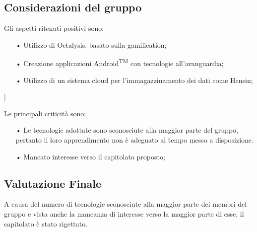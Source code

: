 \subsection{Considerazioni del gruppo}
Gli aspetti ritenuti positivi sono: 
\begin{itemize}
\item[•] Utilizzo di Octalysis, basato sulla gamification;
\item[•] Creazione applicazioni Android\textsuperscript{TM} con tecnologie all'avanguardia;
\item[•] Utilizzo di un sistema cloud per l'immagazzinamento dei dati come Hensin;
\end{itemize}]

Le principali criticità sono:
\begin{itemize}
\item[•] Le tecnologie adottate sono sconosciute alla maggior parte del gruppo, pertanto il loro apprendimento non è adeguato al tempo messo a disposizione. 
\item[•] Mancato interesse verso il capitolato proposto;
\end{itemize}

\subsection{Valutazione Finale}
A causa del numero di tecnologie sconosciute alla maggior parte dei membri del gruppo e vista anche la mancanza di interesse verso la maggior parte di esse, il capitolato è stato rigettato.

